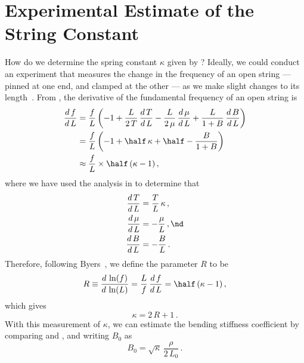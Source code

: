 %
%
%

 \section{Experimental Estimate of the String Constant\label{sct:exp}}

How do we determine the spring constant $\kappa$ given by ? Ideally, we could conduct an experiment that measures the change in the frequency of an open string --- pinned at one end, and clamped at the other --- as we make slight changes to its length~\cite{ref:byers1996cgi,ref:varieschi2010icf}. From , the derivative of the fundamental frequency of an open string is
 \begin{equation}
 \begin{split}
\frac{d\, f}{d\, L} &= \frac{f}{L} \left( -1 + \frac{L}{2\, T}\, \frac{d\, T}{d\, L} - \frac{L}{2\, \mu}\, \frac{d\, \mu}{d\, L} + \frac{L}{1 + B}\, \frac{d\, B}{d\, L} \right) \\
&= \frac{f}{L} \left( -1 + \half\, \kappa + \half - \frac{B}{1 + B} \right) \\
&\approx \frac{f}{L} \times \half\, (\kappa - 1)\, ,
 \end{split}
 \end{equation}
where we have used the analysis in  to determine that
 \begin{subequations}
 \begin{align}
\frac{d\, T}{d\, L} &= \frac{T}{L}\, \kappa\, , \\
\frac{d\, \mu}{d\, L} &= -\frac{\mu}{L}\, , \nd \\
\frac{d\, B}{d\, L} &= -\frac{B}{L}\, . \\
 \end{align}
 \end{subequations}
Therefore, following Byers~\cite{ref:byers1996cgi,ref:varieschi2010icf}, we define the parameter $R$ to be
 \begin{equation}\label{eqn:r_def}
R \equiv \frac{d\, \ln(f)}{d\, \ln(L)} = \frac{L}{f}\, \frac{d\, f}{d\, L} = \half\, (\kappa - 1)\, ,
 \end{equation}
which gives
 \begin{equation} \label{eqn:kappa_r}
\kappa = 2\, R + 1\, .
 \end{equation}
With this measurement of $\kappa$, we can estimate the bending stiffness coefficient by comparing  and , and writing $B_0$ as
 \begin{equation} \label{eqn:b_0_kappa}
B_0 = \sqrt{\kappa}\, \frac{\rho}{2\, L_0}\, .
 \end{equation}

